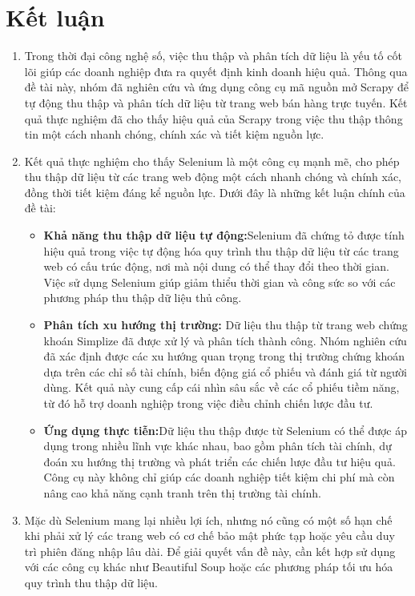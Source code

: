 \section{Kết luận}
\begin{enumerate}
    \item []\hspace*{0.7cm}Trong thời đại công nghệ số, việc thu thập và phân tích dữ liệu là yếu tố cốt lõi giúp các doanh nghiệp đưa ra quyết định kinh doanh hiệu quả. Thông qua đề tài này, nhóm đã nghiên cứu và ứng dụng công cụ mã nguồn mở Scrapy để tự động thu thập và phân tích dữ liệu từ trang web bán hàng trực tuyến. Kết quả thực nghiệm đã cho thấy hiệu quả của Scrapy trong việc thu thập thông tin một cách nhanh chóng, chính xác và tiết kiệm nguồn lực.
    
    \item[]Kết quả thực nghiệm cho thấy Selenium là một công cụ mạnh mẽ, cho phép thu thập dữ liệu từ các trang web động một cách nhanh chóng và chính xác, đồng thời tiết kiệm đáng kể nguồn lực. Dưới đây là những kết luận chính của đề tài:
    \begin{itemize}[left = 0.5cm]
        \item [$\bullet$]\textbf{Khả năng thu thập dữ liệu tự động:}Selenium đã chứng tỏ được tính hiệu quả trong việc tự động hóa quy trình thu thập dữ liệu từ các trang web có cấu trúc động, nơi mà nội dung có thể thay đổi theo thời gian. Việc sử dụng Selenium giúp giảm thiểu thời gian và công sức so với các phương pháp thu thập dữ liệu thủ công.
        
        \item [$\bullet$]\textbf{Phân tích xu hướng thị trường:} Dữ liệu thu thập từ trang web chứng khoán Simplize đã được xử lý và phân tích thành công. Nhóm nghiên cứu đã xác định được các xu hướng quan trọng trong thị trường chứng khoán dựa trên các chỉ số tài chính, biến động giá cổ phiếu và đánh giá từ người dùng. Kết quả này cung cấp cái nhìn sâu sắc về các cổ phiếu tiềm năng, từ đó hỗ trợ doanh nghiệp trong việc điều chỉnh chiến lược đầu tư.

        \item [$\bullet$]\textbf{Ứng dụng thực tiễn:}Dữ liệu thu thập được từ Selenium có thể được áp dụng trong nhiều lĩnh vực khác nhau, bao gồm phân tích tài chính, dự đoán xu hướng thị trường và phát triển các chiến lược đầu tư hiệu quả. Công cụ này không chỉ giúp các doanh nghiệp tiết kiệm chi phí mà còn nâng cao khả năng cạnh tranh trên thị trường tài chính.
    \end{itemize}
    \item[]Mặc dù Selenium mang lại nhiều lợi ích, nhưng nó cũng có một số hạn chế khi phải xử lý các trang web có cơ chế bảo mật phức tạp hoặc yêu cầu duy trì phiên đăng nhập lâu dài. Để giải quyết vấn đề này, cần kết hợp sử dụng với các công cụ khác như Beautiful Soup hoặc các phương pháp tối ưu hóa quy trình thu thập dữ liệu.

 
\end{enumerate}


